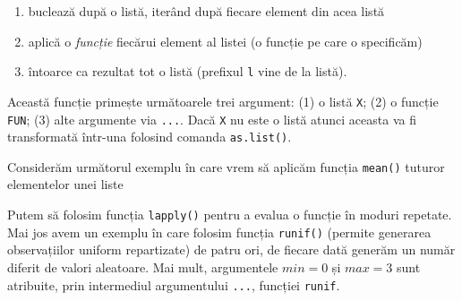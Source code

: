 \documentclass[]{article}
\newenvironment{Shaded}{\begin{snugshade}}{\end{snugshade}}
\newcommand{\KeywordTok}[1]{\textcolor[rgb]{0.13,0.29,0.53}{\textbf{#1}}}
\newcommand{\DataTypeTok}[1]{\textcolor[rgb]{0.13,0.29,0.53}{#1}}
\newcommand{\DecValTok}[1]{\textcolor[rgb]{0.00,0.00,0.81}{#1}}
\newcommand{\FloatTok}[1]{\textcolor[rgb]{0.00,0.00,0.81}{#1}}
\newcommand{\StringTok}[1]{\textcolor[rgb]{0.31,0.60,0.02}{#1}}
\newcommand{\OperatorTok}[1]{\textcolor[rgb]{0.81,0.36,0.00}{\textbf{#1}}}
\newcommand{\NormalTok}[1]{#1}
\providecommand{\tightlist}{%
  \setlength{\itemsep}{0pt}\setlength{\parskip}{0pt}}
\begin{document}
\begin{enumerate}
\def\labelenumi{\arabic{enumi}.}
\tightlist
\item
  buclează după o listă, iterând după fiecare element din acea listă
\item
  aplică o \emph{funcție} fiecărui element al listei (o funcție pe care
  o specificăm)
\item
  întoarce ca rezultat tot o listă (prefixul \texttt{l} vine de la
  listă).
\end{enumerate}

Această funcție primește următoarele trei argument: (1) o listă
\texttt{X}; (2) o funcție \texttt{FUN}; (3) alte argumente via
\texttt{...}. Dacă \texttt{X} nu este o listă atunci aceasta va fi
transformată într-una folosind comanda \texttt{as.list()}.

Considerăm următorul exemplu în care vrem să aplicăm funcția
\texttt{mean()} tuturor elementelor unei liste

\begin{Shaded}
\end{Shaded}

Putem să folosim funcția \texttt{lapply()} pentru a evalua o funcție în
moduri repetate. Mai jos avem un exemplu în care folosim funcția
\texttt{runif()} (permite generarea observațiilor uniform repartizate)
de patru ori, de fiecare dată generăm un număr diferit de valori
aleatoare. Mai mult, argumentele \(min=0\) și \(max=3\) sunt atribuite,
prin intermediul argumentului \texttt{...}, funcției \texttt{runif}.
\end{document}
